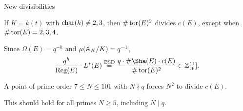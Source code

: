 \begin{frame}{New divisibilities}

\begin{theorem}[A.--Melistas 2026]
If $ K = k(t) $ with $ \operatorname{char}(k) \ne 2, 3 $, then $ \#\operatorname{tor}(E)^2 $ divides $ c(E) $, except when $ \#\operatorname{tor}(E) = 2, 3, 4 $.
\end{theorem}

\bigskip Since $ \Omega(E) = q^{-h} $ and $ \mu(\mathbb{A}_K / K) = q^{-1} $,
$$ \dfrac{q^h}{\Reg(E)} \cdot L^*(E) \overset{\BSD}{=} \dfrac{q \cdot \#\Sha(E) \cdot c(E)}{\#\tor(E)^2} \in \Z[\tfrac{1}{6}]. $$

\begin{theorem}[A.--Melistas 2026]
A point of prime order $ 7 \le N \le 101 $ with $ N \nmid q $ forces $ N^2 $ to divide $ c(E) $.
\end{theorem}

\bigskip This should hold for all primes $ N \ge 5 $, including $ N \mid q $.

\end{frame}

